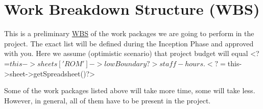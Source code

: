 
\section*{Work Breakdown Structure (WBS)}

This is a preliminary \href{http://en.wikipedia.org/wiki/Work_Breakdown_Structure}{WBS} 
of the work packages we are going to perform in the project. The exact list will
be defined during the Inception Phase and approved with you.
Here we assume (optimistic scenario) that project budget will equal
<?=$this->sheets['ROM']->lowBoundary?>{} staff-hours.

<?=$this->sheet->getSpreadsheet()?>{}

Some of the work packages listed above will take more time, some
will take less. However, in general, all of them have to be present
in the project.
